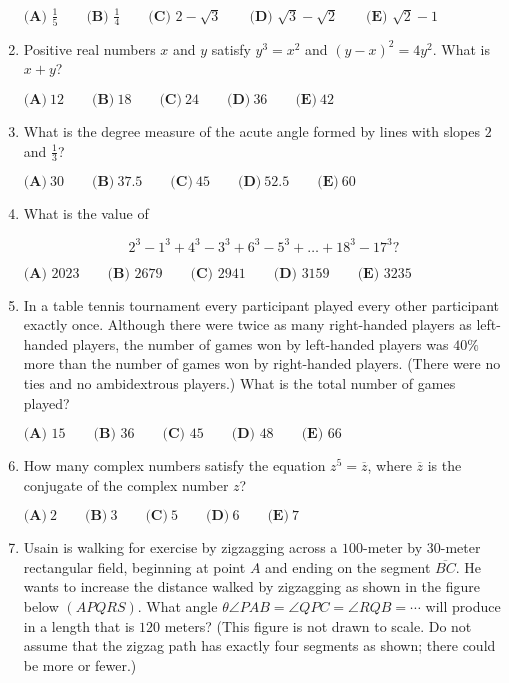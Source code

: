 \documentclass{article}
\begin{document}
\begin{enumerate}[label=\arabic*., itemsep=0.5em]
\(\textbf{(A) }\frac15\qquad\textbf{(B) }\frac14\qquad\textbf{(C) }2-\sqrt3\qquad\textbf{(D) }\sqrt3-\sqrt2\qquad\textbf{(E) }\sqrt2-1\)\par \vspace{0.5em}\item Positive real numbers \(x\) and \(y\) satisfy \(y^3 = x^2\) and \((y-x)^2 = 4y^2\). What is \(x+y\)?

\(\textbf{(A)}\ 12 \qquad \textbf{(B)}\ 18 \qquad \textbf{(C)}\ 24 \qquad \textbf{(D)}\ 36 \qquad \textbf{(E)}\ 42\)\par \vspace{0.5em}\item What is the degree measure of the acute angle formed by lines with slopes \(2\) and \(\tfrac{1}{3}\)?

\(\textbf{(A)}~30\qquad\textbf{(B)}~37.5\qquad\textbf{(C)}~45\qquad\textbf{(D)}~52.5\qquad\textbf{(E)}~60\)\par \vspace{0.5em}\item What is the value of

\begin{equation*}
2^3 - 1^3 + 4^3 - 3^3 + 6^3 - 5^3 + \dots + 18^3 - 17^3?
\end{equation*}


\(\textbf{(A) } 2023 \qquad\textbf{(B) } 2679 \qquad\textbf{(C) } 2941 \qquad\textbf{(D) } 3159 \qquad\textbf{(E) } 3235\)\par \vspace{0.5em}\item In a table tennis tournament every participant played every other participant exactly once. Although there were twice as many right-handed players as left-handed players, the number of games won by left-handed players was \(40\%\) more than the number of games won by right-handed players. (There were no ties and no ambidextrous players.) What is the total number of games played?

\(\textbf{(A) }15\qquad\textbf{(B) }36\qquad\textbf{(C) }45\qquad\textbf{(D) }48\qquad\textbf{(E) }66\)\par \vspace{0.5em}\item How many complex numbers satisfy the equation \(z^{5}=\overline{z}\), where \(\overline{z}\) is the conjugate of the complex number \(z\)?

\(\textbf{(A)}~2\qquad\textbf{(B)}~3\qquad\textbf{(C)}~5\qquad\textbf{(D)}~6\qquad\textbf{(E)}~7\)\par \vspace{0.5em}\item Usain is walking for exercise by zigzagging across a \(100\)-meter by \(30\)-meter rectangular field, beginning at point \(A\) and ending on the segment \(\overline{BC}\). He wants to increase the distance walked by zigzagging as shown in the figure below \((APQRS)\). What angle \(\theta\)\(\angle PAB=\angle QPC=\angle RQB=\cdots\) will produce in a length that is \(120\) meters? (This figure is not drawn to scale. Do not assume that the zigzag path has exactly four segments as shown; there could be more or fewer.)



\end{enumerate}
\end{document}
